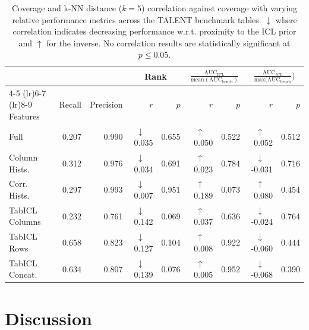\documentclass{article}
\begin{document}
\begin{table}[ht]
\centering
\caption{Coverage and k-NN distance ($k=5$) correlation against coverage with varying relative performance metrics across the TALENT benchmark tables. $\downarrow$ where correlation indicates decreasing performance w.r.t. proximity to the ICL prior and $\uparrow$ for the inverse. No correlation results are statistically significant at $p \leq 0.05$.}
\label{tab:rank}
\small
\begin{tabular}{lrrrrrrrr}
\toprule
 & & & \multicolumn{2}{c}{Rank} & \multicolumn{2}{c}{$\frac{\textrm{AUC}_{\textrm{ICL}}}{\textrm{mean}(\textrm{AUC}_{\textrm{bench}})}$} & \multicolumn{2}{c}{$\frac{\textrm{AUC}_{\textrm{ICL}}}{\textrm{max}(\textrm{AUC}_{\textrm{bench}}})$} \\
\cmidrule(lr){4-5} \cmidrule(lr){6-7} \cmidrule(lr){8-9}
Features & Recall & Precision & $r$ & $p$ & $r$ & $p$ & $r$ & $p$ \\
\midrule
Full       & 0.207 & 0.990 & {$\downarrow \quad$ 0.035} & 0.655 & {$\uparrow \quad$ 0.050} & 0.522 & {$\uparrow \quad$ 0.052} & 0.512 \\
Column Hists.      & 0.312 & 0.976 & {$\downarrow \quad$ 0.034} & 0.691 & {$\uparrow \quad$ 0.023} & 0.784 & {$\downarrow \quad$-0.031} & 0.716 \\
Corr. Hists.      & 0.297 & 0.993 & {$\downarrow \quad$ 0.007} & 0.951 & {$\uparrow \quad$ 0.189} & 0.073 & {$\uparrow \quad$ 0.080} & 0.454 \\ \midrule
TabICL Columns       & 0.232 & 0.761 & {$\downarrow \quad$ 0.142} & 0.069 & {$\uparrow \quad$ 0.037} & 0.636 & {$\downarrow \quad$-0.024} & 0.764 \\
TabICL Rows       & 0.658 & 0.823 & {$\downarrow \quad$ 0.127} & 0.104 & {$\uparrow \quad$ 0.008} & 0.922 & {$\downarrow \quad$-0.060} & 0.444 \\
TabICL Concat.  & 0.634 & 0.807 & {$\downarrow \quad$ 0.139} & 0.076 & {$\uparrow \quad$ 0.005} & 0.952 & {$\downarrow \quad$-0.068} & 0.390 \\
\bottomrule
\end{tabular}
\end{table}


\section{Discussion}
\label{sec:feature-discussion}


\end{document}
